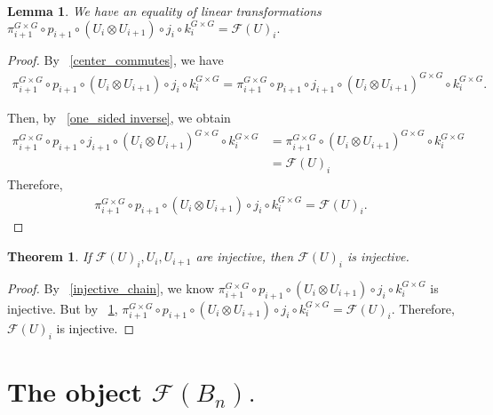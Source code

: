 \documentclass{amsart}
\newtheorem{lem}[subsubsection]{Lemma}
\newtheorem{thm}[subsubsection]{Theorem}
\begin{document}
\begin{lem}
\label{two_equivalent_paths}
We have an equality of linear transformations $\pi^{G\times G}_{i+1}\circ p_{i+1}\circ(U_i\otimes U_{i+1})\circ j_i\circ k^{G\times G}_i = \mathcal F(U)_i.$
\end{lem}
\begin{proof}
By ~\ref{center_commutes}, we have
\begin{align*}
	\pi^{G\times G}_{i+1}\circ p_{i+1}\circ(U_i\otimes U_{i+1})\circ j_i\circ k^{G\times G}_i = \pi^{G\times G}_{i+1}\circ p_{i+1}\circ j_{i+1}\circ(U_i\otimes U_{i+1})^{G\times G}\circ k^{G\times G}_i.
\end{align*}

Then, by ~\ref{one_sided inverse}, we obtain
\begin{align*}
	\pi^{G\times G}_{i+1}\circ p_{i+1}\circ j_{i+1}\circ(U_i\otimes U_{i+1})^{G\times G}\circ k^{G\times G}_i &= \pi^{G\times G}_{i+1}\circ(U_i\otimes U_{i+1})^{G\times G}\circ k^{G\times G}_i\\
	&= \mathcal F(U)_i
\end{align*}
Therefore,
\begin{align*}
	\pi^{G\times G}_{i+1}\circ p_{i+1}\circ(U_i\otimes U_{i+1})\circ j_i\circ k^{G\times G}_i = \mathcal F(U)_i.
\end{align*}
\end{proof}

\begin{thm}
\label{injectivity_thm}
If $\mathcal F(U)_i,U_i,U_{i+1}$ are injective, then $\mathcal F(U)_i$ is injective.
\end{thm}
\begin{proof}
By ~\ref{injective_chain}, we know $\pi^{G\times G}_{i+1}\circ p_{i+1}\circ(U_i\otimes U_{i+1})\circ j_i\circ k^{G\times G}_i$ is injective. But by ~\ref{two_equivalent_paths}, $\pi^{G\times G}_{i+1}\circ p_{i+1}\circ(U_i\otimes U_{i+1})\circ j_i\circ k^{G\times G}_i = \mathcal F(U)_i.$ Therefore, $\mathcal F(U)_i$ is injective.
\end{proof}

\section{The object $\mathcal F(B_n).$}
\end{document}

